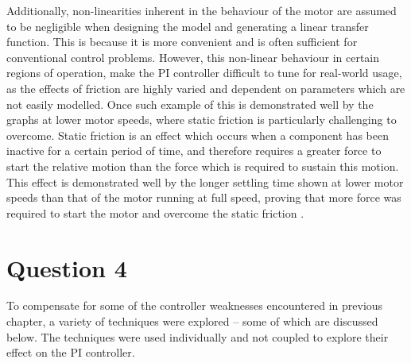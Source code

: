 \documentclass[11pt, onecolumn]{article}
\begin{document}
\par Additionally, non-linearities inherent in the behaviour of the motor are assumed to be negligible when designing the model and generating a linear transfer function. This is because it is more convenient and is often sufficient for conventional control problems. However, this non-linear behaviour in certain regions of operation, make the PI controller difficult to tune for real-world usage, as the effects of friction are highly varied and dependent on parameters which are not easily modelled. Once such example of this is demonstrated well by the graphs at lower motor speeds, where static friction is particularly challenging to overcome. Static friction is an effect which occurs when a component has been inactive for a certain period of time, and therefore requires a greater force to start the relative motion than the force which is required to sustain this motion. This effect is demonstrated well by the longer settling time shown at lower motor speeds than that of the motor running at full speed, proving that more force was required to start the motor and overcome the static friction \cite{ijsrpStudyNonlinear}.
\section*{Question 4}
\par To compensate for some of the controller weaknesses encountered in previous chapter, a variety of techniques were explored – some of which are discussed below. The techniques were used individually and not coupled to explore their effect on the PI controller.
\end{document}
